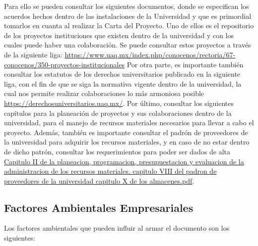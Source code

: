\documentclass[letterpaper,12pt,openright,oneside]{article}
\theoremstyle{plain}
\begin{document}
Para ello se pueden consultar los siguientes documentos, donde se especifican los acuerdos hechos dentro de las instalaciones de la Universidad y que es primordial tomarlos en cuanta al realizar la Carta del Proyecto.
Uno de ellos es el repositorio de los proyectos instituciones que existen dentro de la universidad y con los cuales puede haber una colaboración. Se puede consultar estos proyectos a través de la siguiente liga: \url{https://www.uaq.mx/index.php/conocenos/rectoria/67-conocenos/350-proyectos-institucionales}
Por otra parte, es importante también consultar los estatutos de los derechos universitarios publicado en la siguiente liga, con el fin de que se siga la normativa vigente dentro de la universidad, la cual nos permite realizar colaboraciones lo más armoniosa posible \url{https://derechosuniversitarios.uaq.mx/}.
Por último, consultar los siguientes capítulos para la planeación de proyectos y sus colaboraciones dentro de la universidad, para el manejo de recursos materiales necesarios para llevar a cabo el proyecto. Además, también es importante consultar el padrón de proveedores de la universidad para adquirir los recursos materiales, y en caso de no estar dentro de dicho patrón, consultar los requerimientos para poder ser dados de alta \href{run:https://www.uaq.mx/leyes/regadqu.pdf}{Capitulo II de la planeacion, programacion, presupuestacion y evaluacion de la administracion de los recursos materiales. capitulo VIII del padron de proveedores de la universidad capitulo X de los almacenes.pdf}.


% 
% 
\subsection*{Factores Ambientales Empresariales}

Los factores ambientales que pueden influir al armar el documento son los siguientes:
\end{document}
